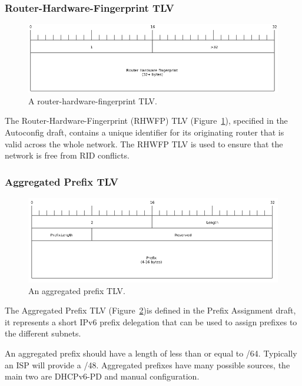 \documentclass[12pt,a4paper,twoside]{report}
\begin{document}
\subsubsection{Router-Hardware-Fingerprint TLV}
\begin{figure}
\begin{center}
	\includegraphics[width=\linewidth]{../Diagrams/Packets/rhwfp_tlv.png}
	\caption{A router-hardware-fingerprint TLV.}\label{fig:RHWFP-TLV}
\end{center}
\end{figure}
The Router-Hardware-Fingerprint (RHWFP) TLV (Figure~\ref{fig:RHWFP-TLV}),
specified in the Autoconfig draft, contains a unique identifier for its
originating router that is valid across the whole network. The RHWFP TLV is
used to ensure that the network is free from RID conflicts.

\subsubsection{Aggregated Prefix TLV}
\begin{figure}
\begin{center}
	\includegraphics[width=\linewidth]{../Diagrams/Packets/aggregated_prefix_tlv.png}
	\caption{An aggregated prefix TLV.}\label{fig:AggregatedPrefix-TLV}
\end{center}
\end{figure}
The Aggregated Prefix TLV (Figure~\ref{fig:AggregatedPrefix-TLV})is defined in
the Prefix Assignment draft, it represents a short IPv6 prefix delegation that
can be used to assign prefixes to the different subnets. 

An aggregated prefix should have a length of less than or equal to /64.
Typically an ISP will provide a /48. Aggregated prefixes have many possible
sources, the main two are DHCPv6-PD and manual configuration. 
\end{document}
